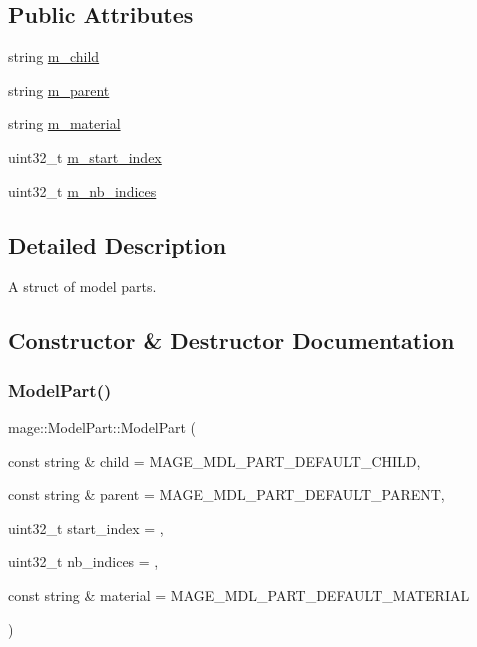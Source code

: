 \subsection*{Public Attributes}
\begin{DoxyCompactItemize}
\item 
string \hyperlink{structmage_1_1_model_part_abac2e9942c2d8015dc8b4f363729dc45}{m\+\_\+child}
\item 
string \hyperlink{structmage_1_1_model_part_ad4754bbb69d28885c09cef591d4d96c5}{m\+\_\+parent}
\item 
string \hyperlink{structmage_1_1_model_part_a606603dd01b895cb1aa91b51089bf27f}{m\+\_\+material}
\item 
uint32\+\_\+t \hyperlink{structmage_1_1_model_part_ac4f520d8284b4af7f20f94b116f7afed}{m\+\_\+start\+\_\+index}
\item 
uint32\+\_\+t \hyperlink{structmage_1_1_model_part_a3944ee7b1bf9a91fd87eefb1cf3c79bc}{m\+\_\+nb\+\_\+indices}
\end{DoxyCompactItemize}


\subsection{Detailed Description}
A struct of model parts. 

\subsection{Constructor \& Destructor Documentation}
\hypertarget{structmage_1_1_model_part_a4a9443af884ad45625f894ae33eaac32}{}\label{structmage_1_1_model_part_a4a9443af884ad45625f894ae33eaac32} 
\subsubsection{\texorpdfstring{Model\+Part()}{ModelPart()}\hspace{0.1cm}{\footnotesize\ttfamily [1/3]}}
{\footnotesize\ttfamily mage\+::\+Model\+Part\+::\+Model\+Part (\begin{DoxyParamCaption}\item[{const string \&}]{child = {\ttfamily MAGE\+\_\+MDL\+\_\+PART\+\_\+DEFAULT\+\_\+CHILD},  }\item[{const string \&}]{parent = {\ttfamily MAGE\+\_\+MDL\+\_\+PART\+\_\+DEFAULT\+\_\+PARENT},  }\item[{uint32\+\_\+t}]{start\+\_\+index = {},  }\item[{uint32\+\_\+t}]{nb\+\_\+indices = {},  }\item[{const string \&}]{material = {\ttfamily MAGE\+\_\+MDL\+\_\+PART\+\_\+DEFAULT\+\_\+MATERIAL} }\end{DoxyParamCaption})\hspace{0.3cm}{\ttfamily [explicit]}}

